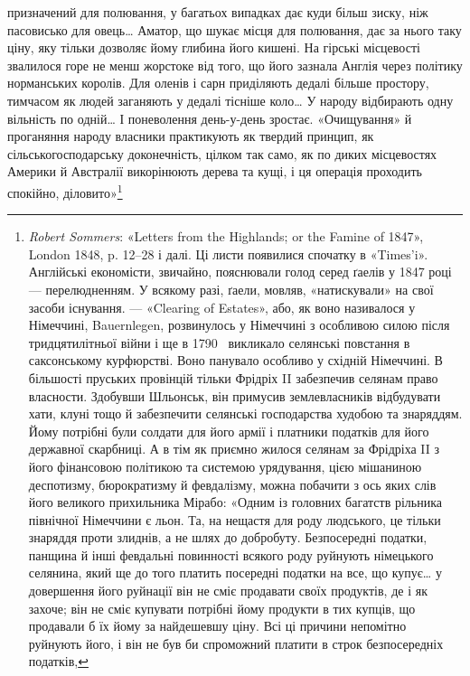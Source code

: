 \parcont{}  %
призначений для полювання, у багатьох випадках дає куди
більш зиску, ніж пасовисько для овець\dots{} Аматор, що шукає
місця для полювання, дає за нього таку ціну, яку тільки дозволяє
йому глибина його кишені. На гірські місцевості звалилося горе
не менш жорстоке від того, що його зазнала Англія через політику
норманських королів. Для оленів і сарн приділяють дедалі
більше простору, тимчасом як людей заганяють у дедалі тісніше
коло\dots{} У народу відбирають одну вільність по одній\dots{} І поневолення
день-у-день зростає. «Очищування» й проганяння
народу власники практикують як твердий принцип, як сільськогосподарську
доконечність, цілком так само, як по диких місцевостях
Америки й Австралії викорінюють дерева та кущі, і ця
операція проходить спокійно, діловито»\footnote{
\emph{Robert Sommers}: «Letters from the Highlands; or the Famine
of 1847», London 1848, p. 12--28 і далі. Ці листи появилися спочатку
в «Times’i». Англійські економісти, звичайно, пояснювали голод серед
ґаелів у 1847 році — перелюдненням. У всякому разі, ґаели, мовляв,
«натискували» на свої засоби існування. — «Clearing of Estates», або,
як воно називалося у Німеччині, Bauernlegen, розвинулось у Німеччині
з особливою силою після тридцятилітньої війни і ще в 1790~ викликало
селянські повстання в саксонському курфюрстві. Воно панувало особливо
у східній Німеччині. В більшості пруських провінцій тільки Фрідріх II
забезпечив селянам право власности. Здобувши Шльонськ, він примусив
землевласників відбудувати хати, клуні тощо й забезпечити селянські
господарства худобою та знаряддям. Йому потрібні були солдати для
його армії і платники податків для його державної скарбниці. А в тім
як приємно жилося селянам за Фрідріха II з його фінансовою політикою
та системою урядування, цією мішаниною деспотизму, бюрократизму
й февдалізму, можна побачити з ось яких слів його великого прихильника
Мірабо: «Одним із головних багатств рільника північної Німеччини
є льон. Та, на нещастя для роду людського, це тільки знаряддя проти
злиднів, а не шлях до добробуту. Безпосередні податки, панщина й інші
февдальні повинності всякого роду руйнують німецького селянина, який
ще до того платить посередні податки на все, що купує\dots{} у довершення
його руйнації він не сміє продавати своїх продуктів, де і як захоче; він
не сміє купувати потрібні йому продукти в тих купців, що продавали б
їх йому за найдешевшу ціну. Всі ці причини непомітно руйнують його,
і він не був би спроможний платити в строк безпосередніх податків,
}
